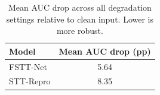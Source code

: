 \begin{table}[!t]
\centering
\caption{Mean AUC drop across all degradation settings relative to clean input. Lower is more robust.}
\label{tab:tableXb_mean_drop}
\footnotesize
\begin{tabular}{lc}
\hline\hline
Model & Mean AUC drop (pp) \\
\hline
FSTT-Net & 5.64 \\
STT-Repro & 8.35 \\
\hline\hline
\end{tabular}
\end{table}
